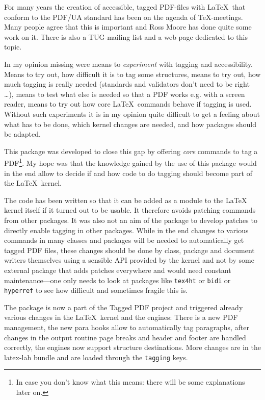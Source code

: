 \documentclass[bibliography=totoc,a4paper]{article}
\newcommand\pkg[1]{\texttt{#1}}
\newcommand\PDF{PDF}
\begin{document}
For many years the creation of accessible, tagged \PDF{}-files with \LaTeX\ 
that conform to the PDF/UA standard has been on the agenda of \TeX-meetings. 
Many people agree that this is important and Ross Moore has done quite some 
work on it. There is also a TUG-mailing list and a web page 
\parencite{tugaccess} dedicated to this topic. 

In my opinion missing were means to \emph{experiment} with tagging and 
accessibility. Means to try out, how difficult it is to tag some structures, 
means to try out, how much tagging is really needed (standards and validators 
don't need to be right \ldots), means to test what else is needed so that a 
\PDF{} works e.g. with a screen reader, means to try out how core \LaTeX\ 
commands behave if tagging is used. Without such experiments it is in my 
opinion quite difficult to get a feeling about what has to be done, which 
kernel changes are needed, and how packages should be adapted. 

This package was developed to close this gap by offering \emph{core} commands 
to tag a \PDF{}\footnote{In case you don't know what this means: there will 
be some explanations later on.}. My hope was that the knowledge gained by the 
use of this package would in the end allow to decide if and how code to do 
tagging should become part of the \LaTeX\ kernel. 


The code has been written so that it can be added as a module to the \LaTeX{} 
kernel itself if it turned out to be usable. It therefore avoids patching 
commands from other packages. It was also not an aim of the package to 
develop patches to directly enable tagging in other packages. While in the end changes to various commands in many 
classes and packages will be needed to automatically get tagged \PDF{} files, these changes 
should be done by class, package and document writers themselves using a 
sensible API provided by the kernel and not by some external package that 
adds patches everywhere and would need constant maintenance---one only needs 
to look at packages like \pkg{tex4ht} or \pkg{bidi} or \pkg{hyperref} to see how difficult and 
sometimes fragile this is. 

The package is now a part of the Tagged PDF project and triggered already 
various changes in the \LaTeX\ kernel and the engines: There is a new PDF 
management, the new para hooks allow to automatically tag paragraphs, after 
changes in the output routine page breaks and header and footer are handled 
correctly, the engines now support structure destinations. More changes are 
in the latex-lab bundle and are loaded through the \texttt{tagging} keys. 
\end{document}

